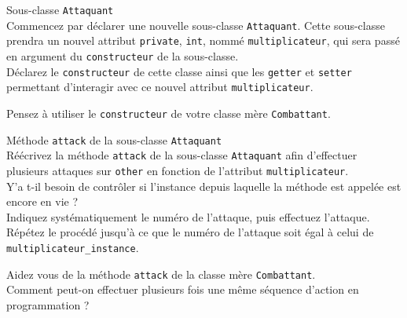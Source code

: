 \begin{Exercice}[5 minutes] Sous-classe \lstinline{Attaquant} \\

Commencez par déclarer une nouvelle sous-classe \lstinline{Attaquant}. Cette sous-classe prendra un nouvel attribut \lstinline{private}, \lstinline{int}, nommé \lstinline{multiplicateur}, qui sera passé en argument du \lstinline{constructeur} de la sous-classe. \\

Déclarez le \lstinline{constructeur} de cette classe ainsi que les \lstinline{getter} et \lstinline{setter} permettant d'interagir avec ce nouvel attribut \lstinline{multiplicateur}. \\

\begin{conseil}
Pensez à utiliser le \lstinline{constructeur} de votre classe mère \lstinline{Combattant}.
\end{conseil}

\begin{solution}
	
\end{solution}

\end{Exercice}

\begin{Exercice}[10 minutes] Méthode \lstinline{attack} de la sous-classe \lstinline{Attaquant} \\

Réécrivez la méthode \lstinline{attack} de la sous-classe \lstinline{Attaquant} afin d'effectuer plusieurs attaques sur \lstinline{other} en fonction de l'attribut \lstinline{multiplicateur}. \\

Y'a t-il besoin de contrôler si l'instance depuis laquelle la méthode est appelée est encore en vie ? \\

Indiquez systématiquement le numéro de l'attaque, puis effectuez l'attaque. Répétez le procédé jusqu'à ce que le numéro de l'attaque soit égal à celui de \lstinline{multiplicateur_instance}.

\begin{conseil}
Aidez vous de la méthode \lstinline{attack} de la classe mère \lstinline{Combattant}.\\

Comment peut-on effectuer plusieurs fois une même séquence d'action en programmation ? \\

\end{conseil}

\begin{solution}
	
\end{solution}

\end{Exercice}

